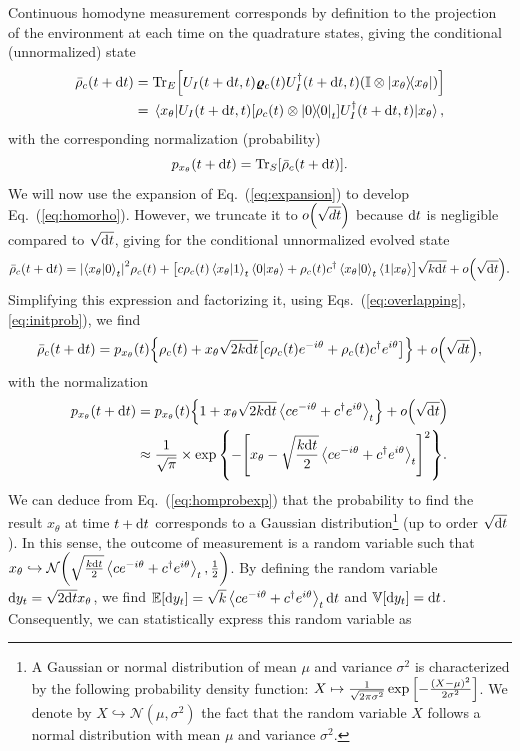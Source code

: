 Continuous homodyne measurement corresponds by definition to the projection of the environment at each time on the quadrature states, giving the conditional (unnormalized) state
\begin{align}\label{eq:homorho}
    \bar{\rho}_c(t+\mathrm{d}t)&=\mathrm{Tr}_E\qty[U_I(t+\mathrm{d}t,t)\bm{\varrho}_c(t)U_I^\dagger(t+\mathrm{d}t,t)\qty(\mathbb{I}\otimes\ketbra{x_\theta})]\notag\\
    &= \expval{U_I(t+\mathrm{d}t,t)\qty[\rho_c(t)\otimes\ketbra{0}_t]U_I^\dagger(t+\mathrm{d}t,t)}{x_\theta},
\end{align}
with the corresponding normalization (probability)
\begin{equation}
    p_{x_\theta}(t+\mathrm{d}t) = \mathrm{Tr}_S\qty[\bar{\rho}_c(t+\mathrm{d}t)].
\end{equation}
We will now use the expansion of Eq.~(\ref{eq:expansion}) to develop Eq.~(\ref{eq:homorho}). However, we truncate it to $o\qty(\sqrt{dt})$ because $\mathrm{d}t$ is negligible compared to $\sqrt{\mathrm{d}t}$, giving for the conditional unnormalized evolved state
\begin{equation}
    \bar{\rho}_c(t+\mathrm{d}t) = \abs{\braket{x_\theta}{0}_t}^2\rho_c(t) + \qty[c\rho_c(t)\braket{x_\theta}{1}_t\braket{0}{x_\theta}+\rho_c(t)c^\dagger\braket{x_\theta}{0}_t\braket{1}{x_\theta}]\sqrt{k\mathrm{d}t}+o\qty(\sqrt{\mathrm{d}t}).
\end{equation}
Simplifying this expression and factorizing it, using Eqs.~(\ref{eq:overlapping},\ref{eq:initprob}), we find
\begin{equation}\label{eq:homrhou}
    \bar{\rho}_c(t+\mathrm{d}t)= p_{x_\theta}(t)\qty{\rho_c(t)+x_\theta\sqrt{2k\mathrm{d}t}\qty[c\rho_c(t)e^{-i\theta}+\rho_c(t)c^\dagger e^{i\theta}]}+o\qty(\sqrt{dt}),
\end{equation}
with the normalization
\begin{align}
    p_{x_\theta}(t+\mathrm{d}t) &= p_{x_\theta}(t)\qty{1+x_\theta\sqrt{2k\mathrm{d}t}\expval{ce^{-i\theta}+c^\dagger e^{i\theta}}_t}+o\qty(\sqrt{\mathrm{d}t})\label{eq:homproblin}\\
    &\approx \frac{1}{\sqrt{\pi}}\times\exp\qty{-\qty[x_\theta-\sqrt{\frac{k\mathrm{d}t}{2}}\expval{ce^{-i\theta}+c^\dagger e^{i\theta}}_t]^2}.\label{eq:homprobexp}
\end{align} We can deduce from Eq.~(\ref{eq:homprobexp}) that the probability to find the result $x_\theta$ at time $t+\mathrm{d}t$ corresponds to a Gaussian distribution\footnote{A Gaussian or normal distribution of mean $\mu$ and variance $\sigma^2$ is characterized by the following probability density function: $X\mapsto\frac{1}{\sqrt{2\pi\sigma^2}}\exp\qty[-\frac{\qty(X-\mu)^2}{2\sigma^2}]$. We denote by $X\hookrightarrow\mathcal{N}(\mu,\sigma^2)$ the fact that the random variable $X$ follows a normal distribution with mean $\mu$ and variance $\sigma^2$.} (up to order $\sqrt{\mathrm{d}t}$). In this sense, the outcome of measurement is a random variable such that $x_\theta\hookrightarrow\mathcal{N}\qty(\sqrt{\frac{k\mathrm{d}t}{2}}\expval{ce^{-i\theta}+c^\dagger e^{i\theta}}_t, \frac{1}{2})$. By defining the random variable $\mathrm{d}y_t=\sqrt{2\mathrm{d}t}x_\theta$, we find $\mathbb{E}\qty[\mathrm{d}y_t]=\sqrt{k}\expval{ce^{-i\theta}+c^\dagger e^{i\theta}}_t\mathrm{d}t$ and $\mathbb{V}\qty[\mathrm{d}y_t]=\mathrm{d}t$. Consequently, we can statistically express this random variable as

